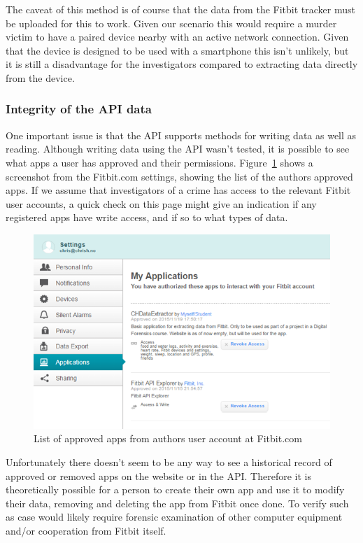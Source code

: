 \documentclass[a4paper,11pt,dvips]{article}
\begin{document}
The caveat of this method is of course that the data from the Fitbit tracker must be uploaded for this to work. Given our scenario this would require a murder victim to have a paired device nearby with an active network connection. Given that the device is designed to be used with a smartphone this isn't unlikely, but it is still a disadvantage for the investigators compared to extracting data directly from the device.

\subsubsection{Integrity of the API data}
One important issue is that the API supports methods for writing data as well as reading. Although writing data using the API wasn't tested, it is possible to see what apps a user has approved and their permissions. Figure~\ref{fig:apisettings} shows a screenshot from the Fitbit.com settings, showing the list of the authors approved apps. If we assume that investigators of a crime has access to the relevant Fitbit user accounts, a quick check on this page might give an indication if any registered apps have write access, and if so to what types of data.

\begin{figure}
\noindent
\includegraphics[natwidth=624bp,natheight=409bp,width=\linewidth]{apisettings}
\caption{List of approved apps from authors user account at Fitbit.com}
\label{fig:apisettings}
\end{figure}

Unfortunately there doesn't seem to be any way to see a historical record of approved or removed apps on the website or in the API. Therefore it is theoretically possible for a person to create their own app and use it to modify their data, removing and deleting the app from Fitbit once done. To verify such as case would likely require forensic examination of other computer equipment and/or cooperation from Fitbit itself.
\end{document}
